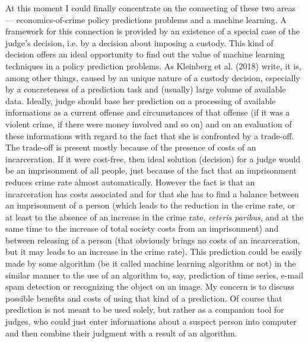 \documentclass[12pt, twoside]{book} %
\begin{document}
At this moment I could finally concentrate on the connecting of these two areas — economics-of-crime policy predictions problems and a machine learning. A framework for this connection is provided by an existence of a special case of the judge's decision, i.e. by a decision about imposing a custody. This kind of decision offers an ideal opportunity to find out the value of machine learning techniques in a policy prediction problems. As Kleinberg et al. (2018) write, it is, among other things, caused by an unique nature of a custody decision, especially by a concreteness of a prediction task and (usually) large volume of available data. Ideally, judge should base her prediction on a processing of available informations as a current offense and circumstances of that offense (if it was a violent crime, if there were money involved and so on) and on an evaluation of these informations with regard to the fact that she is confronted by a trade-off. The trade-off is present mostly because of the presence of costs of an incarceration. If it were cost-free, then ideal solution (decision) for a judge would be an imprisonment of all people, just because of the fact that an imprisonment reduces crime rate almost automatically. However the fact is that an incarceration has costs associated and for that she has to find a balance between an imprisonment of a person (which leads to the reduction in the crime rate, or at least to the absence of an increase in the crime rate, \textit{ceteris paribus}, and at the same time to the increase of total society costs from an imprisonment) and between releasing of a person (that obviously brings no costs of an incarceration, but it may leads to an increase in the crime rate). This prediction could be easily made by some algorithm (be it called machine learning algorithm or not) in the similar manner to the use of an algorithm to, say, prediction of time series, e-mail spam detection or recognizing the object on an image. My concern is to discuss possible benefits and costs of using that kind of a prediction. Of course that prediction is not meant to be used solely, but rather as a companion tool for judges, who could just enter informations about a suspect person into computer and then combine their judgment with a result of an algorithm. \newline
\end{document}
